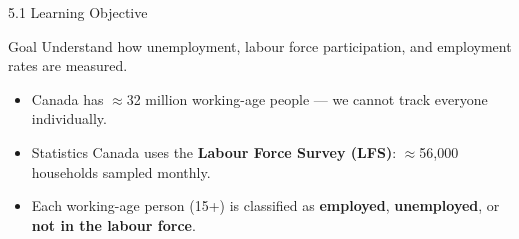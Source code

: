\documentclass[aspectratio=169]{beamer}
\begin{document}
\begin{frame}{5.1 Learning Objective}
\transfade
\begin{block}{Goal}
Understand how unemployment, labour force participation, and employment rates are measured.
\end{block}
\begin{itemize}
  \item Canada has $\approx$32 million working-age people --- we cannot track everyone individually.
  \item Statistics Canada uses the \textbf{Labour Force Survey (LFS)}: $\approx$56,000 households sampled monthly.
  \item Each working-age person (15+) is classified as \textbf{employed}, \textbf{unemployed}, or \textbf{not in the labour force}.
\end{itemize}
\end{frame}
\end{document}
